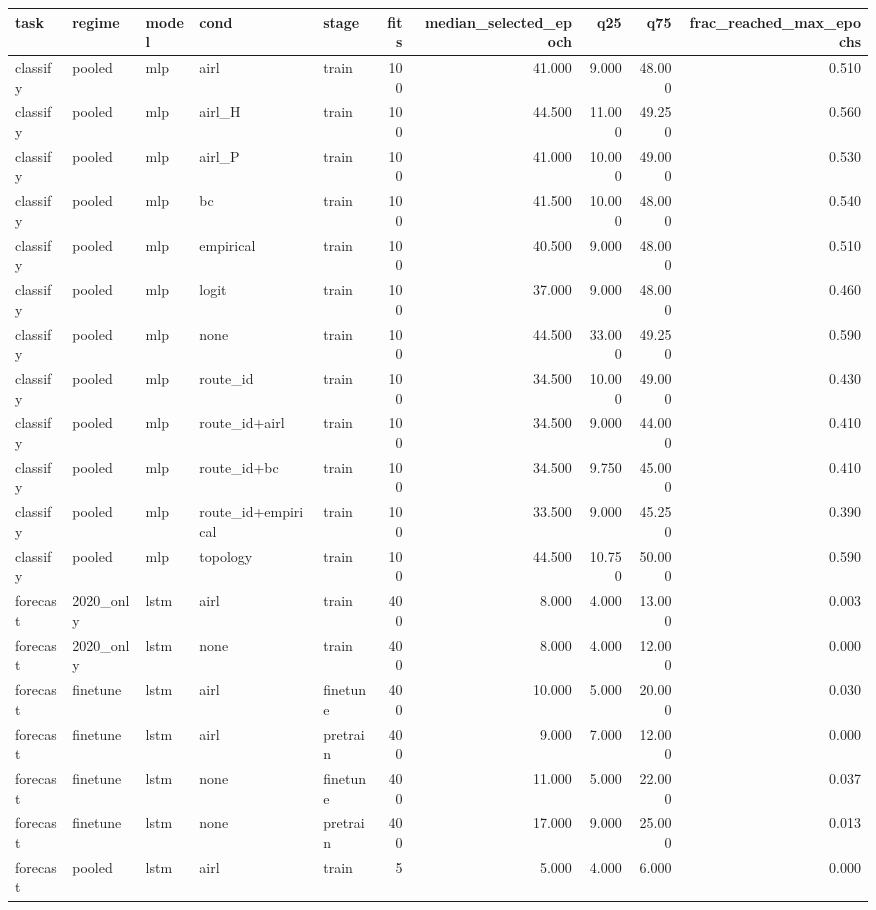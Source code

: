 \begin{tabular}{lllllrrrrr}
\toprule
task & regime & model & cond & stage & fits & median_selected_epoch & q25 & q75 & frac_reached_max_epochs \\
\midrule
classify & pooled & mlp & airl & train & 100 & 41.000 & 9.000 & 48.000 & 0.510 \\
classify & pooled & mlp & airl_H & train & 100 & 44.500 & 11.000 & 49.250 & 0.560 \\
classify & pooled & mlp & airl_P & train & 100 & 41.000 & 10.000 & 49.000 & 0.530 \\
classify & pooled & mlp & bc & train & 100 & 41.500 & 10.000 & 48.000 & 0.540 \\
classify & pooled & mlp & empirical & train & 100 & 40.500 & 9.000 & 48.000 & 0.510 \\
classify & pooled & mlp & logit & train & 100 & 37.000 & 9.000 & 48.000 & 0.460 \\
classify & pooled & mlp & none & train & 100 & 44.500 & 33.000 & 49.250 & 0.590 \\
classify & pooled & mlp & route_id & train & 100 & 34.500 & 10.000 & 49.000 & 0.430 \\
classify & pooled & mlp & route_id+airl & train & 100 & 34.500 & 9.000 & 44.000 & 0.410 \\
classify & pooled & mlp & route_id+bc & train & 100 & 34.500 & 9.750 & 45.000 & 0.410 \\
classify & pooled & mlp & route_id+empirical & train & 100 & 33.500 & 9.000 & 45.250 & 0.390 \\
classify & pooled & mlp & topology & train & 100 & 44.500 & 10.750 & 50.000 & 0.590 \\
forecast & 2020_only & lstm & airl & train & 400 & 8.000 & 4.000 & 13.000 & 0.003 \\
forecast & 2020_only & lstm & none & train & 400 & 8.000 & 4.000 & 12.000 & 0.000 \\
forecast & finetune & lstm & airl & finetune & 400 & 10.000 & 5.000 & 20.000 & 0.030 \\
forecast & finetune & lstm & airl & pretrain & 400 & 9.000 & 7.000 & 12.000 & 0.000 \\
forecast & finetune & lstm & none & finetune & 400 & 11.000 & 5.000 & 22.000 & 0.037 \\
forecast & finetune & lstm & none & pretrain & 400 & 17.000 & 9.000 & 25.000 & 0.013 \\
forecast & pooled & lstm & airl & train & 5 & 5.000 & 4.000 & 6.000 & 0.000 \\

\end{tabular}

